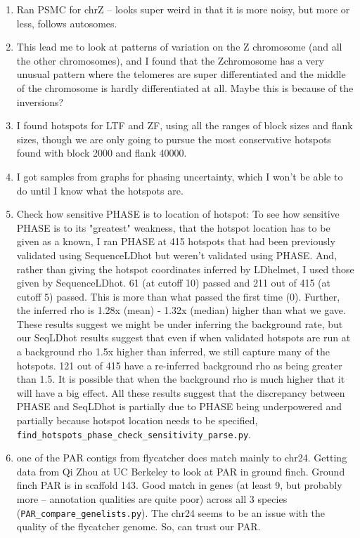 \documentclass[idxtotoc,hyperref,openany,oneside]{labbook} %
\begin{document}
\begin{enumerate}
\item Ran PSMC for chrZ -- looks super weird in that it is more noisy, but more or less, follows autosomes.
\item This lead me to look at patterns of variation on the Z chromosome (and all the other chromosomes), and I found that the Zchromosome has a very unusual pattern where the telomeres are super differentiated and the middle of the chromosome is hardly differentiated at all. Maybe this is because of the inversions?
\item I found hotspots for LTF and ZF, using all the ranges of block sizes and flank sizes, though we are only going to pursue the most conservative hotspots found with block 2000 and flank 40000.
\item I got samples from graphs for phasing uncertainty, which I won't be able to do until I know what the hotspots are.
\item Check how sensitive PHASE is to location of hotspot: To see how sensitive PHASE is to its "greatest" weakness, that the hotspot location has to be given as a known, I ran PHASE at 415 hotspots that had been previously validated using SequenceLDhot but weren't validated using PHASE. And, rather than giving the hotspot coordinates inferred by LDhelmet, I used those given by SequenceLDhot. 61 (at cutoff 10) passed and 211 out of 415 (at cutoff 5) passed. This is more than what passed the first time (0). Further, the inferred rho is 1.28x (mean) - 1.32x (median) higher than what we gave. These results suggest we might be under inferring the background rate, but our SeqLDhot results suggest that even if when validated hotspots are run at a background rho 1.5x higher than inferred, we still capture many of the hotspots. 121 out of 415 have a re-inferred background rho as being greater than 1.5. It is possible that when the background rho is much higher that it will have a big effect. All these results suggest that the discrepancy between PHASE and SeqLDhot is partially due to PHASE being underpowered and partially because hotspot location needs to be specified, \verb+find_hotspots_phase_check_sensitivity_parse.py+.
\item one of the PAR contigs from flycatcher does match mainly to chr24. Getting data from Qi Zhou at UC Berkeley to look at PAR in ground finch. Ground finch PAR is in scaffold 143. Good match in genes (at least 9, but probably more -- annotation qualities are quite poor) across all 3 species (\verb+PAR_compare_genelists.py+). The chr24 seems to be an issue with the quality of the flycatcher genome. So, can trust our PAR.

\end{enumerate}
\end{document}
